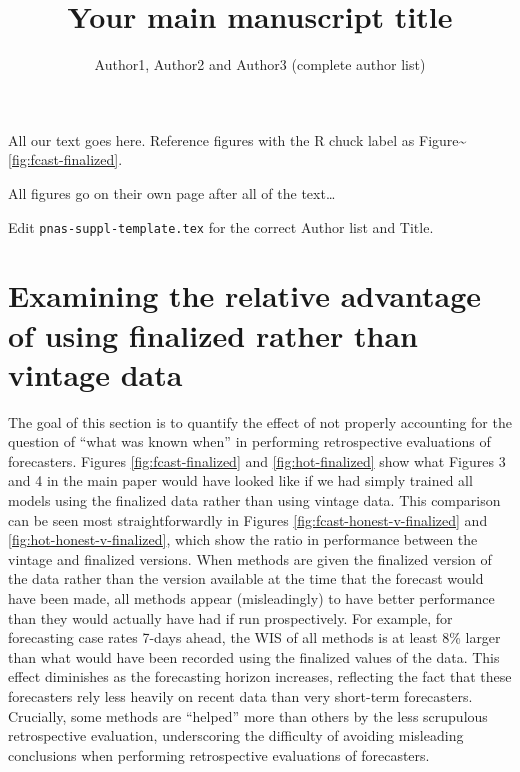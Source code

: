 \documentclass[9pt,twoside,lineno]{pnas-new}
\title{Your main manuscript title}
\author{Author1, Author2 and Author3 (complete author list)}
\begin{document}
\instructionspage

\maketitle

\SItext

All our text goes here. Reference figures with the R chuck label as
Figure\textasciitilde{}\ref{fig:fcast-finalized}.

All figures go on their own page after all of the text\ldots{}

Edit \texttt{pnas-suppl-template.tex} for the correct Author list and
Title.

\hypertarget{examining-the-relative-advantage-of-using-finalized-rather-than-vintage-data}{%
\section{Examining the relative advantage of using finalized rather than
vintage
data}\label{examining-the-relative-advantage-of-using-finalized-rather-than-vintage-data}}


The goal of this section is to quantify the effect of
not properly accounting for the question of ``what was known when'' in
performing retrospective evaluations of forecasters.   Figures \ref{fig:fcast-finalized} and \ref{fig:hot-finalized} show
what Figures 3 and 4 in the main paper would have looked like if we
had simply trained all models using the finalized data rather than
using vintage data.  This comparison can be seen most
straightforwardly in Figures \ref{fig:fcast-honest-v-finalized} and \ref{fig:hot-honest-v-finalized}, which show the ratio in performance between the vintage and finalized
versions.  When methods are
given the finalized version of the data rather than the version available at the time that the forecast would have been made, all methods
appear (misleadingly) to have better performance than they would
actually have had if run prospectively.  For example, for forecasting case rates
7-days ahead, the WIS of all methods is at least 8\% larger than what would have been
recorded using the finalized values of the data.  This effect
diminishes as the forecasting horizon increases, reflecting the fact
that these forecasters rely less heavily on recent data than very
short-term forecasters.  Crucially, some methods are
``helped'' more than others by the less scrupulous retrospective
evaluation, underscoring the difficulty of avoiding misleading
conclusions when performing retrospective evaluations of forecasters.
\end{document}

